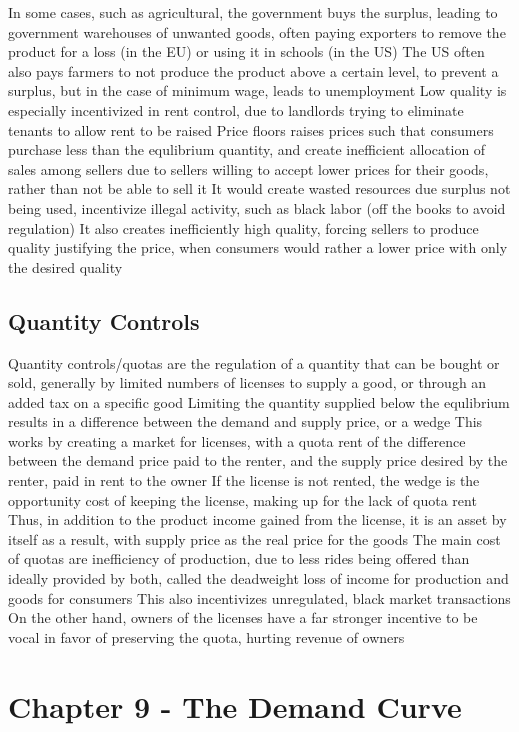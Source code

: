 \documentclass[11 pt, twoside]{article}
\newenvironment{outline*}
{
	\begin{outline}[enumerate]
	}
	{\end{outline}
}
\begin{document}
\begin{outline*}
\2 In some cases, such as agricultural, the government buys the surplus, leading to government warehouses of unwanted goods, often paying exporters to remove the product for a loss (in the EU) or using it in schools (in the US)
\2 The US often also pays farmers to not produce the product above a certain level, to prevent a surplus, but in the case of minimum wage, leads to unemployment
\2 Low quality is especially incentivized in rent control, due to landlords trying to eliminate tenants to allow rent to be raised
\1 Price floors raises prices such that consumers purchase less than the equlibrium quantity, and create inefficient allocation of sales among sellers due to sellers willing to accept lower prices for their goods, rather than not be able to sell it
\2 It would create wasted resources due surplus not being used, incentivize illegal activity, such as black labor (off the books to avoid regulation)
\2 It also creates inefficiently high quality, forcing sellers to produce quality justifying the price, when consumers would rather a lower price with only the desired quality
\end{outline*}

\subsection{Quantity Controls}
\begin{outline*}
\1 Quantity controls/quotas are the regulation of a quantity that can be bought or sold, generally by limited numbers of licenses to supply a good, or through an added tax on a specific good
\1 Limiting the quantity supplied below the equlibrium results in a difference between the demand and supply price, or a wedge
\2 This works by creating a market for licenses, with a quota rent of the difference between the demand price paid to the renter, and the supply price desired by the renter, paid in rent to the owner
\2 If the license is not rented, the wedge is the opportunity cost of keeping the license, making up for the lack of quota rent
\2 Thus, in addition to the product income gained from the license, it is an asset by itself as a result, with supply price as the real price for the goods
\1 The main cost of quotas are inefficiency of production, due to less rides being offered than ideally provided by both, called the deadweight loss of income for production and goods for consumers
\2 This also incentivizes unregulated, black market transactions
\2 On the other hand, owners of the licenses have a far stronger incentive to be vocal in favor of preserving the quota, hurting revenue of owners
\end{outline*}

\section{Chapter 9 - The Demand Curve}
\end{document}
